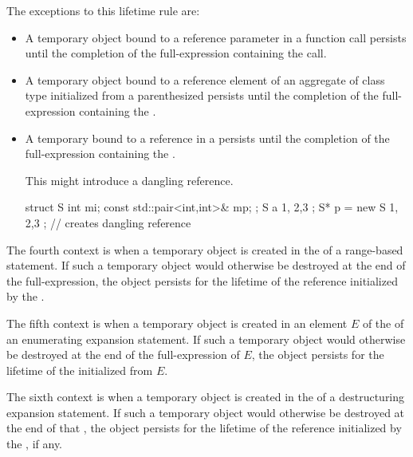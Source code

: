 The exceptions to this lifetime rule are:
\begin{itemize}
\item A temporary object bound to a reference parameter in a function call
persists until the completion of the full-expression containing the call.

\item A temporary object bound to a reference element of
an aggregate of class type initialized from
a parenthesized 
persists until the completion of the full-expression
containing the .

\item A temporary bound to a reference in a  persists until the completion of the full-expression containing the .
\begin{note}
This might introduce a dangling reference.
\end{note}
\begin{example}
\begin{codeblock}
struct S { int mi; const std::pair<int,int>& mp; };
S a { 1, {2,3} };
S* p = new S{ 1, {2,3} };       // creates dangling reference
\end{codeblock}
\end{example}
\end{itemize}

\pnum
The fourth context is when a temporary object
is created in the  of
a range-based  statement.
If such a temporary object would otherwise be destroyed
at the end of the  full-expression,
the object persists for the lifetime of the reference
initialized by the .

\pnum
The fifth context is when a temporary object is created in an element $E$
of the 
of an enumerating expansion statement.
If such a temporary object would otherwise be destroyed
at the end of the full-expression of $E$,
the object persists for the lifetime of the 
initialized from $E$.

\pnum
The sixth context is when a temporary object is created
in the 
of a destructuring expansion statement.
If such a temporary object would otherwise be destroyed
at the end of that ,
the object persists for the lifetime of the reference
initialized by the , if any.

